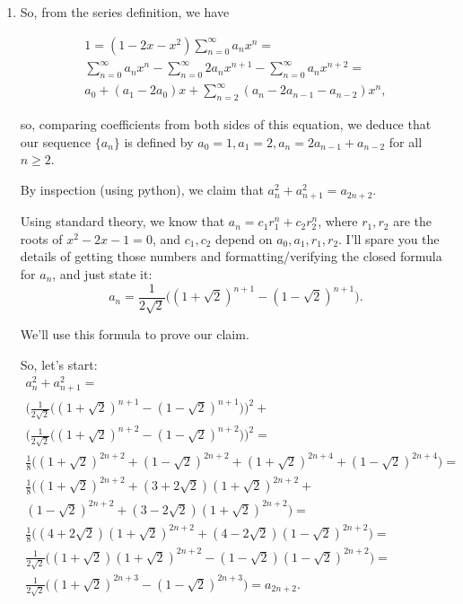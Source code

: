 \documentclass{article}
\begin{document}
\begin{enumerate}
\item So, from the series definition, we have

\begin{eqnarray*}
1 = (1 - 2x -x^2)\sum_{n = 0}^{\infty}a_n x^n = \\
\sum_{n = 0}^{\infty}a_n x^n - \sum_{n = 0}^{\infty}2a_n x^{n + 1} - \sum_{n = 0}^{\infty}a_n x^{n + 2} = \\
a_0 + (a_1 - 2a_0)x + \sum_{n = 2}^{\infty}(a_n -2a_{n - 1} - a_{n - 2}) x^n,
\end{eqnarray*}

so, comparing coefficients from both sides of this equation, we deduce that our
sequence $\{a_n\}$ is defined by $a_0 = 1, a_1 = 2, a_n = 2a_{n - 1} + a_{n - 2}$
for all $n \geq 2$.

By inspection (using python), we claim that $a_n^2 + a_{n + 1}^2 = a_{2n + 2}.$

Using standard theory, we know that $a_n = c_1r_1^n + c_2r_2^n$, where
$r_1, r_2$ are the roots of $x^2 - 2x - 1 = 0$, and $c_1, c_2$ depend on
$a_0, a_1, r_1, r_2$. I'll spare you the details of getting those numbers and
formatting/verifying the closed formula for $a_n$, and just state it:
$$
	a_n = \frac{1}{2\sqrt2}\bigl((1 + \sqrt{2})^{n + 1} - (1 - \sqrt{2})^{n + 1}\bigr).
$$

We'll use this formula to prove our claim.

So, let's start:
\begin{eqnarray*}
a_n^2 + a_{n + 1}^2 = \\
\bigl(\frac{1}{2\sqrt2}\bigl((1 + \sqrt{2})^{n + 1} - (1 - \sqrt{2})^{n + 1}\bigr)\bigr)^2 + \\
\bigl(\frac{1}{2\sqrt2}\bigl((1 + \sqrt{2})^{n + 2} - (1 - \sqrt{2})^{n + 2}\bigr)\bigr)^2 = \\
\frac{1}{8}\bigl( (1 + \sqrt{2})^{2n + 2} + (1 - \sqrt{2})^{2n + 2} + (1 + \sqrt{2})^{2n + 4} + (1 - \sqrt{2})^{2n + 4}\bigr) = \\ 
\frac{1}{8}\bigl((1 + \sqrt{2})^{2n + 2} + (3 + 2\sqrt{2})(1 + \sqrt{2})^{2n + 2} + \\
(1 - \sqrt{2})^{2n + 2} + (3 - 2\sqrt{2})(1 + \sqrt{2})^{2n + 2}\bigr) = \\
\frac{1}{8}\bigl((4 + 2\sqrt{2})(1 + \sqrt{2})^{2n + 2} + (4 - 2\sqrt{2})(1 - \sqrt{2})^{2n + 2}\bigr) = \\
\frac{1}{2\sqrt2}\bigl((1 + \sqrt{2})(1 + \sqrt{2})^{2n + 2} - (1 - \sqrt{2})(1 - \sqrt{2})^{2n + 2}\bigr) = \\
\frac{1}{2\sqrt2}\bigl((1 + \sqrt{2})^{2n + 3} - (1 - \sqrt{2})^{2n + 3}\bigr) = a_{2n + 2}.
\end{eqnarray*}


\end{enumerate}
\end{document}
